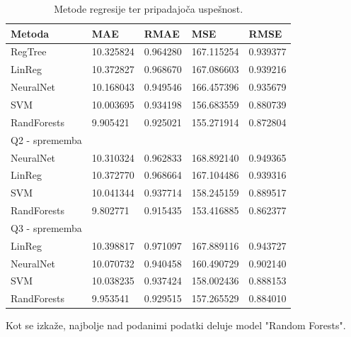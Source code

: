 \documentclass[a4paper,11pt]{article}
\begin{document}
\begin{table}[H]
\caption{Metode regresije ter pripadajoča uspešnost.}
\label{tab1}
\begin{center}
\begin{tabular}{llllp{3cm}}
\hline
Metoda & MAE & RMAE & MSE & RMSE\\
\hline
RegTree & 10.325824 & 0.964280 & 167.115254 & 0.939377 \\
LinReg & 10.372827 & 0.968670 & 167.086603 & 0.939216 \\
NeuralNet & 10.168043 & 0.949546 & 166.457396 & 0.935679 \\
SVM & 10.003695 & 0.934198 & 156.683559 & 0.880739 \\
RandForests & 9.905421 & 0.925021 & 155.271914 & 0.872804 \\
\hline
Q2	- sprememba \\
\hline
NeuralNet & 10.310324 & 0.962833 & 168.892140 & 0.949365 \\
LinReg & 10.372770 & 0.968664 & 167.104486 & 0.939316 \\
SVM & 10.041344 & 0.937714 & 158.245159 & 0.889517 \\
RandForests & 9.802771 & 0.915435 & 153.416885 & 0.862377 \\
\hline
Q3	- sprememba \\
\hline
LinReg & 10.398817 & 0.971097 & 167.889116 & 0.943727 \\
NeuralNet & 10.070732 & 0.940458 & 160.490729 & 0.902140 \\
SVM & 10.038235 & 0.937424 & 158.002436 & 0.888153 \\
RandForests & 9.953541 & 0.929515 & 157.265529 & 0.884010 \\
\hline
\end{tabular}
\end{center}
\end{table}

Kot se izkaže, najbolje nad podanimi podatki deluje model "Random 
Forests". 
\end{document}

